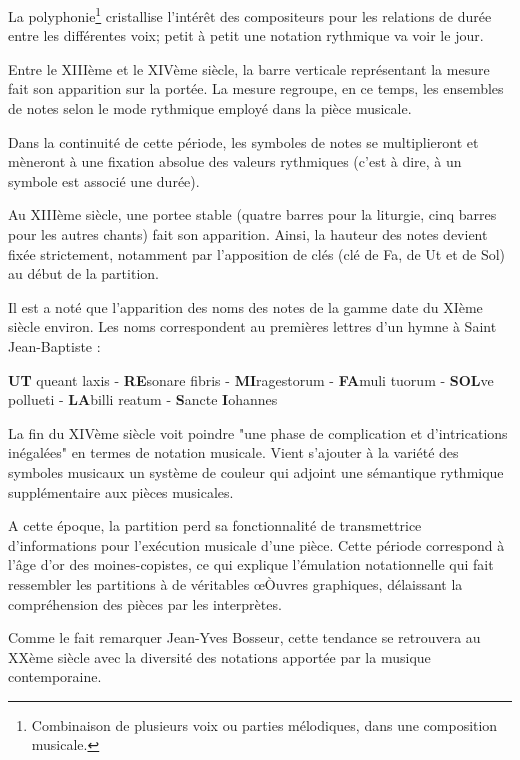 La \gls{polyphonie}\footnote{Combinaison de plusieurs voix ou parties mélodiques, dans une composition musicale.} cristallise l'intérêt des compositeurs pour les relations de durée entre les différentes voix; petit à petit une notation rythmique va voir le jour.

Entre le XIIIème et le XIVème siècle, la barre verticale représentant la mesure fait son apparition sur la portée. La mesure regroupe, en ce temps, les ensembles de notes selon le mode rythmique employé dans la pièce musicale.

Dans la continuité de cette période, les symboles de notes se multiplieront et mèneront à une fixation absolue des valeurs rythmiques (c'est à dire, à un symbole est associé une durée).

Au XIIIème siècle, une \gls{portee} stable (quatre barres pour la liturgie, cinq barres pour les autres chants) fait son apparition. Ainsi, la hauteur des notes devient fixée strictement, notamment par l'apposition de clés (clé de Fa, de Ut et de Sol) au début de la partition.

Il est a noté que l'apparition des noms des notes de la gamme date du XIème siècle environ. Les noms correspondent au premières lettres d'un hymne à Saint Jean-Baptiste :

\begin{center}
	\textbf{UT} queant laxis - \textbf{RE}sonare fibris - \textbf{MI}ragestorum - \textbf{FA}muli tuorum -  \textbf{SOL}ve pollueti - \textbf{LA}billi reatum - \textbf{S}ancte \textbf{I}ohannes
\end{center}

La fin du XIVème siècle voit poindre "une phase de complication et d'intrications inégalées"\cite{bosseur2005} en termes de notation musicale. Vient s'ajouter à la variété des symboles musicaux un système de couleur qui adjoint une sémantique rythmique supplémentaire aux pièces musicales.

A cette époque, la partition perd sa fonctionnalité de transmettrice d'informations pour l'exécution musicale d'une pièce. Cette période correspond à l'âge d'or des moines-copistes, ce qui explique l'émulation notationnelle qui fait ressembler les partitions à de véritables œÒuvres graphiques, délaissant la compréhension des pièces par les interprètes.

Comme le fait remarquer Jean-Yves Bosseur, cette tendance se retrouvera au XXème siècle avec la diversité des notations apportée par la musique contemporaine. 
   
